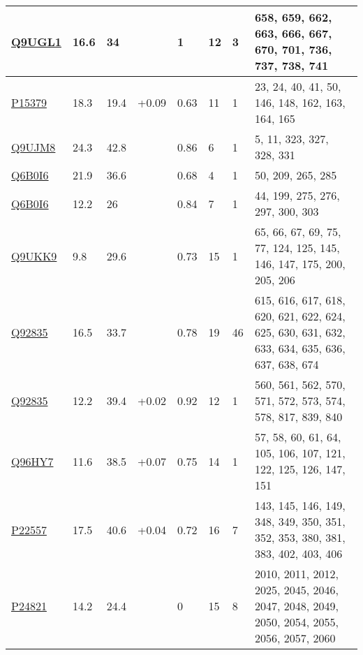 \begin{landscape}
\begin{longtable}{|M{22mm}|M{17mm}|M{18mm}|M{13mm}|M{13mm}|M{10mm}|M{10mm}|M{96mm}|}
\href{https://www.uniprot.org/uniprotkb/Q9UGL1/entry}{Q9UGL1}     & 16.6 & 34       &  & 1    & 12          & 3          & 658, 659, 662, 663, 666, 667, 670, 701, 736, 737, 738, 741                                         \\ \hline
\href{https://www.uniprot.org/uniprotkb/P15379/entry}{P15379}     & 18.3 & 19.4     & +0.09  & 0.63 & 11          & 1          & 23, 24, 40, 41, 50, 146, 148, 162, 163, 164, 165                                                   \\ \hline
\href{https://www.uniprot.org/uniprotkb/Q9UJM8/entry}{Q9UJM8}     & 24.3 & 42.8     &  & 0.86 & 6           & 1          & 5, 11, 323, 327, 328, 331                                                                          \\ \hline
\href{https://www.uniprot.org/uniprotkb/Q6B0I6/entry}{Q6B0I6}     & 21.9 & 36.6     &  & 0.68 & 4           & 1          & 50, 209, 265, 285                                                                                  \\ \hline
\href{https://www.uniprot.org/uniprotkb/Q6B0I6/entry}{Q6B0I6}     & 12.2 & 26       &  & 0.84 & 7           & 1          & 44, 199, 275, 276, 297, 300, 303                                                                   \\ \hline
\href{https://www.uniprot.org/uniprotkb/Q9UKK9/entry}{Q9UKK9}     & 9.8  & 29.6     &  & 0.73 & 15          & 1          & 65, 66, 67, 69, 75, 77, 124, 125, 145, 146, 147, 175, 200, 205, 206                                \\ \hline
\href{https://www.uniprot.org/uniprotkb/Q92835/entry}{Q92835}     & 16.5 & 33.7     &  & 0.78 & 19          & 46         & 615, 616, 617, 618, 620, 621, 622, 624, 625, 630, 631, 632, 633, 634, 635, 636, 637, 638, 674      \\ \hline
\href{https://www.uniprot.org/uniprotkb/Q92835/entry}{Q92835}     & 12.2 & 39.4     & +0.02  & 0.92 & 12          & 1          & 560, 561, 562, 570, 571, 572, 573, 574, 578, 817, 839, 840                                         \\ \hline
\href{https://www.uniprot.org/uniprotkb/Q96HY7/entry}{Q96HY7}     & 11.6 & 38.5     & +0.07  & 0.75 & 14          & 1          & 57, 58, 60, 61, 64, 105, 106, 107, 121, 122, 125, 126, 147, 151                                    \\ \hline
\href{https://www.uniprot.org/uniprotkb/P22557/entry}{P22557}     & 17.5 & 40.6     & +0.04  & 0.72 & 16          & 7          & 143, 145, 146, 149, 348, 349, 350, 351, 352, 353, 380, 381, 383, 402, 403, 406                     \\ \hline
\href{https://www.uniprot.org/uniprotkb/P24821/entry}{P24821}     & 14.2 & 24.4     &  & 0    & 15          & 8          & 2010, 2011, 2012, 2025, 2045, 2046, 2047, 2048, 2049, 2050, 2054, 2055, 2056, 2057, 2060           \\ \hline


\end{longtable}
\end{landscape}
